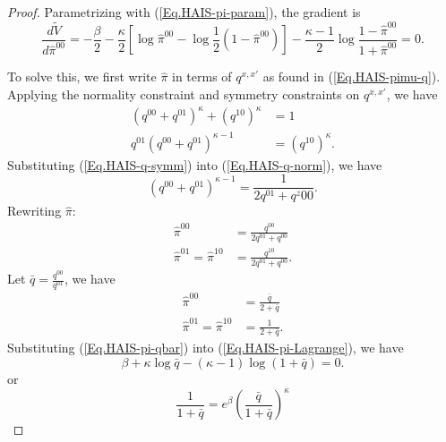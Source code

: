 \documentclass[12pt]{article}
\numberwithin{equation}{section}
\begin{document}
\begin{proof}
    Parametrizing with (\ref{Eq.HAIS-pi-param}), the gradient is
    \begin{equation}
        \frac{d\widetilde{V}}{d\widehat{\pi}^{00}} = -\frac\beta2-\frac\kappa2 \left[\log\widehat{\pi}^{00} - \log \frac12(1 - \widehat{\pi}^{00})\right] - \frac{\kappa-1}{2}\log\frac{1-\widehat{\pi}^{00}}{1+\widehat{\pi}^{00}} = 0.
        \label{Eq.HAIS-pi-Lagrange}
    \end{equation}

    To solve this, we first write $\widehat{\pi}$ in terms of $q^{x, x'}$ as found in (\ref{Eq.HAIS-pimu-q}). Applying the normality constraint and symmetry constraints on $q^{x, x'}$, we have
    \begin{align}
        (q^{00} + q^{01})^\kappa + (q^{10})^\kappa & = 1               \label{Eq.HAIS-q-norm}  \\
        q^{01}(q^{00}+q^{01})^{\kappa-1}           & = (q^{10})^\kappa \label{Eq.HAIS-q-symm}.
    \end{align}
    Substituting (\ref{Eq.HAIS-q-symm}) into (\ref{Eq.HAIS-q-norm}), we have
    \begin{equation*}
        (q^{00}+q^{01})^{\kappa-1} = \frac{1}{2q^{01}+q^z{00}}.
    \end{equation*}
    Rewriting $\widehat{\pi}$:
    \begin{align*}
        \widehat{\pi}^{00}                      & = \frac{q^{00}}{2q^{01}+q^{00}}  \\
        \widehat{\pi}^{01} = \widehat{\pi}^{10} & = \frac{q^{10}}{2q^{01}+q^{00}}.
    \end{align*}
    Let $\bar{q} = \frac{q^{00}}{q^{01}}$, we have
    \begin{equation*}
        \begin{aligned}
            \widehat{\pi}^{00}                      & = \displaystyle\frac{\bar{q}}{2+\bar{q}} \\
            \widehat{\pi}^{01} = \widehat{\pi}^{10} & = \displaystyle\frac{1}{2+\bar{q}}.
        \end{aligned}
    \end{equation*}
    Substituting (\ref{Eq.HAIS-pi-qbar}) into (\ref{Eq.HAIS-pi-Lagrange}), we have
    \begin{equation*}
        \beta + \kappa \log \bar{q} - (\kappa-1)\log (1+\bar{q}) = 0.
    \end{equation*}
    or
    \begin{equation}
        \frac{1}{1+\bar{q}} = e^\beta \left(\frac{\bar{q}}{1+\bar{q}}\right)^\kappa
        \label{Eq.HAIS-q-2}
    \end{equation}


\end{proof}
\end{document}

